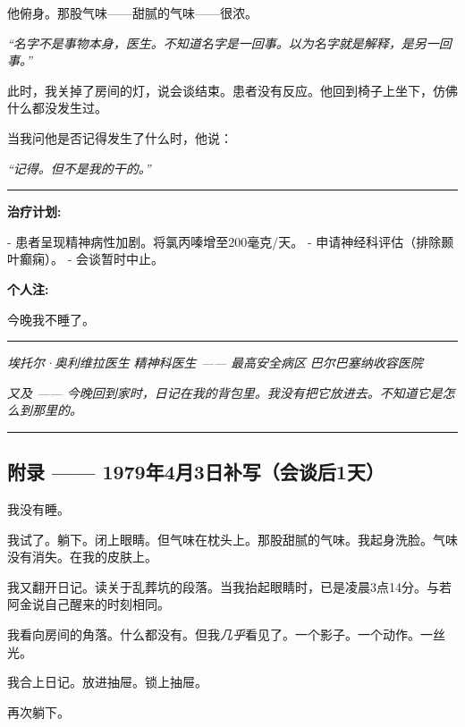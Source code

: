 \noindent 他俯身。那股气味——甜腻的气味——很浓。

\noindent \textit{“名字不是事物本身，医生。不知道名字是一回事。以为名字就是解释，是另一回事。”}

\noindent 此时，我关掉了房间的灯，说会谈结束。患者没有反应。他回到椅子上坐下，仿佛什么都没发生过。

\noindent 当我问他是否记得发生了什么时，他说：

\noindent \textit{“记得。但不是我的干的。”}

\vspace{0.5em}\noindent\rule{\textwidth}{0.5pt}\vspace{0.5em}

\noindent \textbf{治疗计划:}

\noindent - 患者呈现精神病性加剧。将氯丙嗪增至200毫克/天。
- 申请神经科评估（排除颞叶癫痫）。
- 会谈暂时中止。

\noindent \textbf{个人注:}

\noindent 今晚我不睡了。

\vspace{0.5em}\noindent\rule{\textwidth}{0.5pt}\vspace{0.5em}

\noindent \textit{埃托尔·奥利维拉医生}
\textit{精神科医生 —— 最高安全病区}
\textit{巴尔巴塞纳收容医院}

\noindent \textit{又及 —— 今晚回到家时，日记在我的背包里。我没有把它放进去。不知道它是怎么到那里的。}

\vspace{0.5em}\noindent\rule{\textwidth}{0.5pt}\vspace{0.5em}

\subsection*{附录 —— 1979年4月3日补写（会谈后1天）}

\noindent 我没有睡。

\noindent 我试了。躺下。闭上眼睛。但气味在枕头上。那股甜腻的气味。我起身洗脸。气味没有消失。在我的皮肤上。

\noindent 我又翻开日记。读关于乱葬坑的段落。当我抬起眼睛时，已是凌晨3点14分。与若阿金说自己醒来的时刻相同。

\noindent 我看向房间的角落。什么都没有。但我\textit{几乎}看见了。一个影子。一个动作。一丝光。

\noindent 我合上日记。放进抽屉。锁上抽屉。

\noindent 再次躺下。

